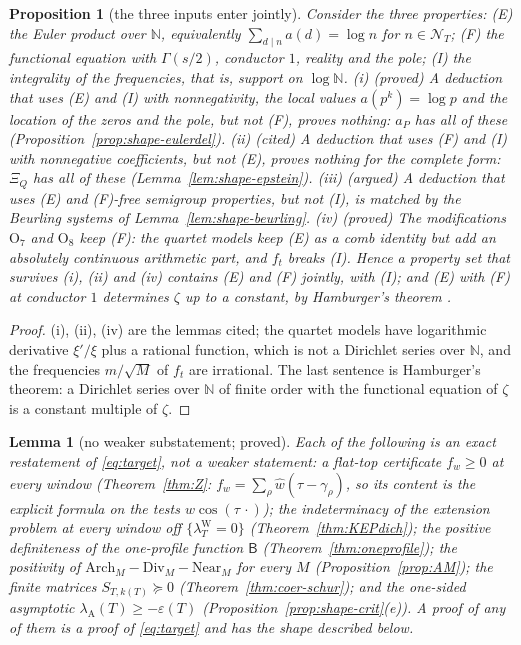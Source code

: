 \documentclass[11pt]{amsart}
\newtheorem{proposition}[theorem]{Proposition}
\newtheorem{lemma}[theorem]{Lemma}
\theoremstyle{definition}
\theoremstyle{remark}
\newcommand{\N}{\mathbb N}
\newcommand{\lamW}{\lambda^{\mathrm W}_T}
\newcommand{\lamA}{\lambda_{\mathrm A}(T)}
\newcommand{\wh}{\widehat w}
\newcommand{\NT}{\mathcal N_T}
\begin{document}
\begin{proposition}[the three inputs enter jointly]\label{prop:shape-inputs}
Consider the three properties: (E) the Euler product over $\N$, equivalently $\sum_{d\mid n}a(d)=\log n$ for $n\in\NT$; (F) the functional
equation with $\Gamma(s/2)$, conductor $1$, reality and the pole; (I) the integrality of the frequencies, that is, support on $\log\N$.
\emph{(i) (proved)} A deduction that uses (E) and (I) with nonnegativity, the local values $a(p^k)=\log p$ and the location of the zeros
and the pole, but not (F), proves nothing: $a_P$ has all of these (Proposition~\ref{prop:shape-eulerdel}).
\emph{(ii) (cited)} A deduction that uses (F) and (I) with nonnegative coefficients, but not (E), proves nothing for the complete form:
$\Xi_Q$ has all of these (Lemma~\ref{lem:shape-epstein}).
\emph{(iii) (argued)} A deduction that uses (E) and (F)-free semigroup properties, but not (I), is matched by the Beurling systems
of Lemma~\ref{lem:shape-beurling}.
\emph{(iv) (proved)} The modifications $\mathrm O_7$ and $\mathrm O_8$ keep (F): the quartet models keep (E) as a comb identity but add an
absolutely continuous arithmetic part, and $f_t$ breaks (I). Hence a property set that survives (i), (ii) and (iv) contains (E) and (F)
jointly, with (I); and (E) with (F) at conductor $1$ determines $\zeta$ up to a constant, by Hamburger's theorem \cite[\S2.13]{Titchmarsh1986}.
\end{proposition}
\begin{proof}
(i), (ii), (iv) are the lemmas cited; the quartet models have logarithmic derivative $\xi'/\xi$ plus a rational function, which is not a
Dirichlet series over $\N$, and the frequencies $m/\sqrt M$ of $f_t$ are irrational. The last sentence is Hamburger's theorem: a Dirichlet
series over $\N$ of finite order with the functional equation of $\zeta$ is a constant multiple of $\zeta$.
\end{proof}

\begin{lemma}[no weaker substatement; proved]\label{lem:shape-restate}
Each of the following is an exact restatement of \eqref{eq:target}, not a weaker statement: a flat-top certificate $f_w\ge0$ at every
window (Theorem~\ref{thm:Z}: $f_w=\sum_\rho\wh(\tau-\gamma_\rho)$, so its content is the explicit formula on the tests $w\cos(\tau\,\cdot)$);
the indeterminacy of the extension problem at every window off $\{\lamW=0\}$ (Theorem~\ref{thm:KEPdich}); the positive definiteness of
the one-profile function $\mathsf B$ (Theorem~\ref{thm:oneprofile}); the positivity of $\mathrm{Arch}_M-\mathrm{Div}_M-\mathrm{Near}_M$ for
every $M$ (Proposition~\ref{prop:AM}); the finite matrices $S_{T,k(T)}\succeq0$ (Theorem~\ref{thm:coer-schur}); and the one-sided
asymptotic $\lamA\ge-\varepsilon(T)$ (Proposition~\ref{prop:shape-crit}(e)). A proof of any of them is a proof of \eqref{eq:target} and has
the shape described below.
\end{lemma}
\end{document}
